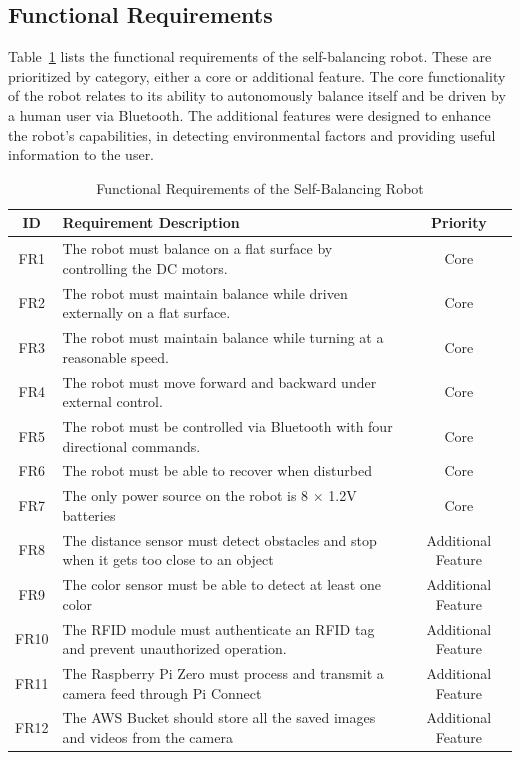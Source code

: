 \documentclass{article}
\begin{document}
\subsection{Functional Requirements}

Table~\ref{tab:functional_requirements} lists the functional requirements of the self-balancing robot. These are prioritized by category,
either a core or additional feature. The core functionality of the robot relates to its ability to autonomously balance itself and be driven
by a human user via Bluetooth. The additional features were designed to enhance the robot's capabilities, in detecting environmental factors and
providing useful information to the user.

\begin{table}[H]
    \centering
    \renewcommand{\arraystretch}{1.3} %
    \begin{tabularx}{\textwidth}{|c|X|c|}
        \hline
        \textbf{ID} & \textbf{Requirement Description} & \textbf{Priority} \\
        \hline
        FR1 & The robot must balance on a flat surface by controlling the DC motors. & Core \\
        \hline
        FR2 & The robot must maintain balance while driven externally on a flat surface. & Core \\
        \hline
        FR3 & The robot must maintain balance while turning at a reasonable speed. & Core \\
        \hline
        FR4 & The robot must move forward and backward under external control. & Core \\
        \hline
        FR5 & The robot must be controlled via Bluetooth with four directional commands. & Core \\
        \hline
        FR6 & The robot must be able to recover when disturbed & Core \\
        \hline
        FR7 & The only power source on the robot is 8 $\times$ 1.2V batteries & Core \\
        \hline
        FR8 & The distance sensor must detect obstacles and stop when it gets too close to an object & Additional Feature \\
        \hline
        FR9 & The color sensor must be able to detect at least one color & Additional Feature \\
        \hline
        FR10 & The RFID module must authenticate an RFID tag and prevent unauthorized operation. & Additional Feature \\
        \hline
        FR11 & The Raspberry Pi Zero must process and transmit a camera feed through Pi Connect & Additional Feature \\
        \hline
        FR12 & The AWS Bucket should store all the saved images and videos from the camera & Additional Feature \\
        \hline
    \end{tabularx}
    \caption{Functional Requirements of the Self-Balancing Robot}
    \label{tab:functional_requirements}
\end{table}
\end{document}
